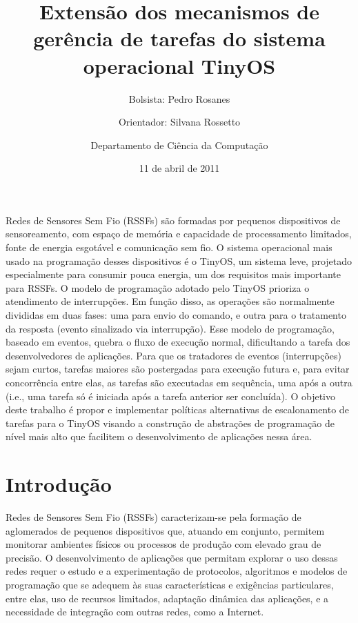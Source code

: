 \documentclass[a4paper,onecolumn, 10pt]{article}
\title{Extensão dos mecanismos de gerência de tarefas do sistema operacional TinyOS}
\author{Bolsista: Pedro Rosanes \and Orientador: Silvana Rossetto \and Departamento de Ciência da Computação}
\date{11 de abril de 2011}
\begin{document}
\maketitle

\label{resumo}
Redes de Sensores Sem Fio (RSSFs) são formadas por pequenos dispositivos de sensoreamento, com 
espaço de memória e capacidade de processamento limitados, fonte de energia esgotável e comunicação sem fio.
O sistema operacional mais usado na programação desses dispositivos é o TinyOS, um sistema leve, 
projetado especialmente para consumir pouca energia, um dos requisitos mais importante para RSSFs. 
O modelo de programação adotado pelo TinyOS prioriza o atendimento de interrupções.
Em função disso, as operações são normalmente divididas em duas fases: uma para envio
do comando, e outra para o tratamento da resposta (evento sinalizado via interrupção). 
Esse modelo de programação, baseado em eventos, quebra o fluxo de execução normal, dificultando a
tarefa dos desenvolvedores de aplicações. 
Para que os tratadores de eventos (interrupções) sejam curtos, tarefas maiores são
postergadas para execução futura e, para evitar concorrência entre elas,
as tarefas são executadas em sequência, uma após a outra (i.e., uma tarefa só é iniciada após a tarefa
anterior ser concluída).  
O objetivo deste trabalho é propor e implementar políticas alternativas de escalonamento de tarefas
para o TinyOS visando a construção de abstrações de programação de nível mais alto que 
facilitem o desenvolvimento de aplicações nessa área.

\section{Introdução}\label{intro}
Redes de Sensores Sem Fio (RSSFs) caracterizam-se pela formação de aglomerados de pequenos 
dispositivos que, atuando em conjunto, permitem monitorar ambientes físicos ou processos de 
produção com elevado grau de precisão. O desenvolvimento de aplicações que permitam explorar 
o uso dessas redes requer o estudo e a experimentação de protocolos, algoritmos e modelos de 
programação que se adequem às suas características e exigências particulares, entre elas, uso
de recursos limitados, adaptação dinâmica das aplicações, e a necessidade de integração com
outras redes, como a Internet.
\end{document}
